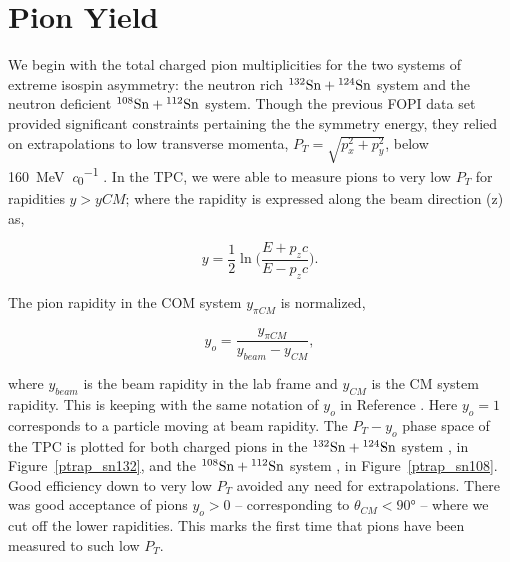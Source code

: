 

\section{Pion Yield}

We begin with the total charged pion multiplicities for the two systems of extreme isospin asymmetry:  the neutron rich ${}^{132}\mathrm{Sn} + {}^{124}\mathrm{Sn}$ system and the neutron deficient  ${}^{108}\mathrm{Sn} + {}^{112}\mathrm{Sn}$ system. Though the previous FOPI data set provided significant constraints pertaining the the symmetry energy, they relied on extrapolations to low transverse momenta, $P_T = \sqrt{p_x^2 + p_y^2}$, below \SI{160}{\mega\electronvolt\per\clight} \cite{fopi}. In the \spirit TPC, we were able to measure pions to very low $P_T$ for rapidities $y > y{CM}$; where the rapidity is expressed along the beam direction (z) as,

\begin{equation}
y = \frac{1}{2} \ln\Big( \frac{E + p_zc}{E - p_zc}\Big).
\end{equation}

The pion rapidity in the COM system $y_{\pi CM}$ is normalized,

\begin{equation}
y_o = \frac{y_{\pi CM}}{y_{beam} - y_{CM}},
\end{equation}

where $y_{beam}$ is the beam rapidity in the lab frame and $y_{CM}$ is the CM system rapidity. This is keeping with the same notation of $y_o$ in Reference \cite{fopi}. Here $y_o = 1$ corresponds to a particle moving at beam rapidity. The   $P_T - y_o$ phase space of the \spirit TPC is plotted for both charged pions in the ${}^{132}\mathrm{Sn} + {}^{124}\mathrm{Sn}$ system , in Figure~\ref{ptrap_sn132}, and the ${}^{108}\mathrm{Sn} + {}^{112}\mathrm{Sn}$ system , in Figure~\ref{ptrap_sn108}. Good efficiency down to very low $P_T$ avoided any need for extrapolations. There was good acceptance of pions $y_o > 0$ -- corresponding to $\theta_{CM} < \ang{90}$ -- where we cut off the lower rapidities. This marks the first time that pions have been measured to such low $P_T$. 

